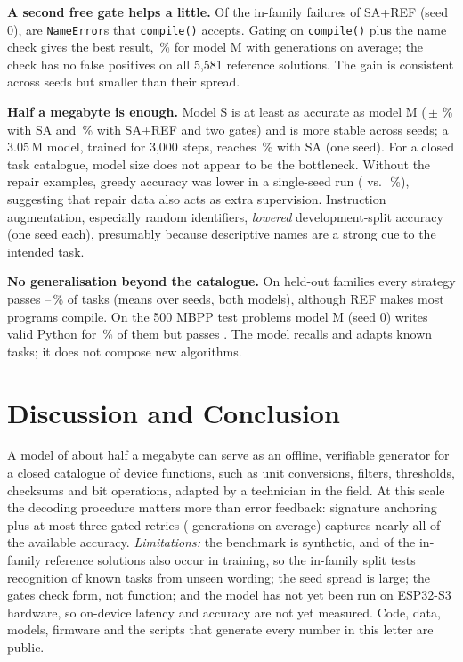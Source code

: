 \documentclass[journal]{IEEEtran}
\begin{document}
\textbf{A second free gate helps a little.} Of the \failidtotal{} in-family failures of SA+REF (seed 0), \failidnameerr{} are \texttt{NameError}s that \texttt{compile()} accepts. Gating on \texttt{compile()} plus the name check gives the best result, \testidareflintpass\,\% for model M with \testidareflintgens{} generations on average; the check has no false positives on all 5{,}581 reference solutions. The gain is consistent across seeds but smaller than their spread.

\textbf{Half a megabyte is enough.} Model S is at least as accurate as model M (\seedsSmalltestidanchor\,$\pm$\,\seedsSmalltestidanchorsd\,\% with SA and \seedsSmalltestidareflint\,\% with SA+REF and two gates) and is more stable across seeds; a 3.05\,M model, trained for 3{,}000 steps, reaches \ablLargeanchorpass\,\% with SA (one seed). For a closed task catalogue, model size does not appear to be the bottleneck. Without the repair examples, greedy accuracy was lower in a single-seed run (\ablGenonlygreedypass{} vs.\ \ablFinalgreedypass\,\%), suggesting that repair data also acts as extra supervision. Instruction augmentation, especially random identifiers, \emph{lowered} development-split accuracy (one seed each), presumably because descriptive names are a strong cue to the intended task.

\textbf{No generalisation beyond the catalogue.} On held-out families every strategy passes \testoodgreedypass--\seedsSmalltestoodareflint\,\% of tasks (means over seeds, both models), although REF makes most programs compile. On the 500 MBPP test problems model M (seed 0) writes valid Python for \mbppgreedyvalid\,\% of them but passes \mbppgreedypassed{}. The model recalls and adapts known tasks; it does not compose new algorithms.

\section{Discussion and Conclusion}
A model of about half a megabyte can serve as an offline, verifiable generator for a closed catalogue of device functions, such as unit conversions, filters, thresholds, checksums and bit operations, adapted by a technician in the field. At this scale the decoding procedure matters more than error feedback: signature anchoring plus at most three gated retries (\testidareflintgens{} generations on average) captures nearly all of the available accuracy. \emph{Limitations:} the benchmark is synthetic, and \codeoverlapid{} of the \ntestid{} in-family reference solutions also occur in training, so the in-family split tests recognition of known tasks from unseen wording; the seed spread is large; the gates check form, not function; and the model has not yet been run on ESP32-S3 hardware, so on-device latency and accuracy are not yet measured. Code, data, models, firmware and the scripts that generate every number in this letter are public.
\end{document}

